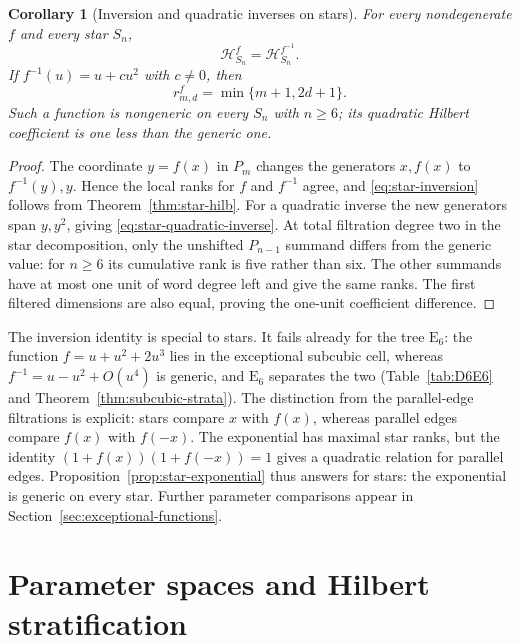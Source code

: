 \documentclass[reqno]{article}
\theoremstyle{plain} %
\newtheorem{corollary}[theorem]{Corollary}
\theoremstyle{definition}
\theoremstyle{remark}
\newcommand{\hs}{\mathscr{H}}
\numberwithin{equation}{section}
\begin{document}
\begin{corollary}[Inversion and quadratic inverses on stars]
\label{cor:star-inversion}
For every nondegenerate $f$ and every star $S_n$,
\begin{equation}\label{eq:star-inversion}
 \hs_{S_n}^f=\hs_{S_n}^{f^{-1}}.
\end{equation}
If $f^{-1}(u)=u+cu^2$ with $c\ne0$, then
\begin{equation}\label{eq:star-quadratic-inverse}
 r_{m,d}^f=\min\{m+1,2d+1\}.
\end{equation}
Such a function is nongeneric on every $S_n$ with $n\ge6$; its
quadratic Hilbert coefficient is one less than the generic one.
\end{corollary}
\begin{proof}
The coordinate $y=f(x)$ in $P_m$ changes the generators $x,f(x)$ to
$f^{-1}(y),y$. Hence the local ranks for $f$ and $f^{-1}$ agree, and
\eqref{eq:star-inversion} follows from Theorem~\ref{thm:star-hilb}.
For a quadratic inverse the new generators span $y,y^2$, giving
\eqref{eq:star-quadratic-inverse}.
At total filtration degree two in the star decomposition, only the
unshifted $P_{n-1}$ summand differs from the generic value: for $n\ge6$
its cumulative rank is five rather than six. The other summands have
at most one unit of word degree left and give the same ranks. The
first filtered dimensions are also equal, proving the one-unit
coefficient difference.
\end{proof}

The inversion identity is special to stars. It fails already for the
tree $\mathrm E_6$: the function $f=u+u^2+2u^3$ lies in the exceptional subcubic
cell, whereas $f^{-1}=u-u^2+O(u^4)$ is generic, and $\mathrm E_6$ separates the
two (Table~\ref{tab:D6E6} and Theorem~\ref{thm:subcubic-strata}). The distinction from the parallel-edge filtrations is explicit: stars compare $x$ with $f(x)$, whereas parallel edges compare
$f(x)$ with $f(-x)$. The exponential has maximal star ranks, but the
identity $(1+f(x))(1+f(-x))=1$ gives a quadratic relation for parallel
edges. Proposition~\ref{prop:star-exponential} thus answers
\cite[Problem~3]{NSh} for stars: the exponential is generic on every
star. Further parameter comparisons appear in
Section~\ref{sec:exceptional-functions}.

\section{Parameter spaces and Hilbert stratification}
\label{sec:strata}
\end{document}
